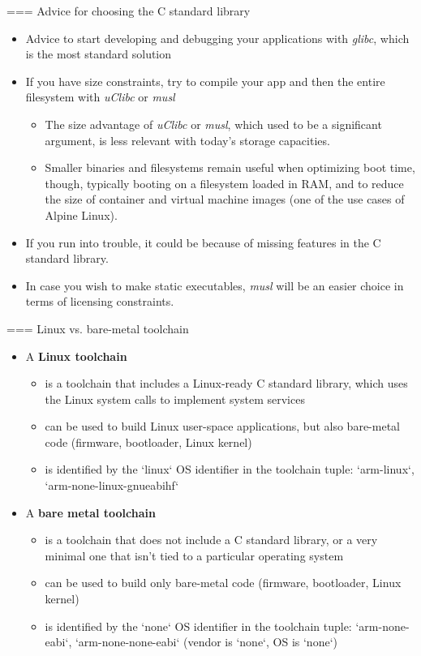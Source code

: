 === Advice for choosing the C standard library
  \begin{itemize}
  \item Advice to start developing and debugging your applications
    with {\em glibc}, which is the most standard solution
  \item If you have size constraints, try to compile your app and then
    the entire filesystem with {\em uClibc} or {\em musl}
    \begin{itemize}
    \item The size advantage of {\em uClibc} or {\em musl}, which used
      to be a significant argument, is less relevant with today's
      storage capacities.
    \item Smaller binaries and filesystems remain useful when optimizing
      boot time, though, typically booting on a filesystem loaded in
      RAM, and to reduce the size of container and virtual machine images
      (one of the use cases of Alpine Linux).
    \end{itemize}
  \item If you run into trouble, it could be because of missing
    features in the C standard library.
  \item In case you wish to make static executables, {\em musl} will
    be an easier choice in terms of licensing constraints.
  \end{itemize}


=== {Linux vs. bare-metal toolchain}
  \begin{itemize}
  \item A {\bf Linux toolchain}
    \begin{itemize}
    \item is a toolchain that includes a Linux-ready C standard library, which
      uses the Linux system calls to implement system services
    \item can be used to build Linux user-space applications, but also
      bare-metal code (firmware, bootloader, Linux kernel)
    \item is identified by the `linux` OS identifier in the
      toolchain tuple: `arm-linux`,
      `arm-none-linux-gnueabihf`
    \end{itemize}
  \item A {\bf bare metal toolchain}
    \begin{itemize}
    \item is a toolchain that does not include a C standard library, or a very
      minimal one that isn't tied to a particular operating
      system
    \item can be used to build only bare-metal code (firmware,
      bootloader, Linux kernel)
    \item is identified by the `none` OS identifier in the
      toolchain tuple: `arm-none-eabi`, `arm-none-none-eabi`
      (vendor is `none`, OS is `none`)
    \end{itemize}
  \end{itemize}


